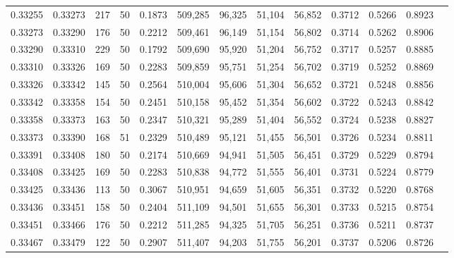 \begin{tabular}{rrrrrrrrrrrrr}
0.33255 & 0.33273 &   217 &  50 &                                     0.1873 & 509,285 &  96,325 &  51,104 &  56,852 & 0.3712 & 0.5266 & 0.8923 \\
0.33273 & 0.33290 &   176 &  50 &                                     0.2212 & 509,461 &  96,149 &  51,154 &  56,802 & 0.3714 & 0.5262 & 0.8906 \\
0.33290 & 0.33310 &   229 &  50 &                                     0.1792 & 509,690 &  95,920 &  51,204 &  56,752 & 0.3717 & 0.5257 & 0.8885 \\
0.33310 & 0.33326 &   169 &  50 &                                     0.2283 & 509,859 &  95,751 &  51,254 &  56,702 & 0.3719 & 0.5252 & 0.8869 \\
0.33326 & 0.33342 &   145 &  50 &                                     0.2564 & 510,004 &  95,606 &  51,304 &  56,652 & 0.3721 & 0.5248 & 0.8856 \\
0.33342 & 0.33358 &   154 &  50 &                                     0.2451 & 510,158 &  95,452 &  51,354 &  56,602 & 0.3722 & 0.5243 & 0.8842 \\
0.33358 & 0.33373 &   163 &  50 &                                     0.2347 & 510,321 &  95,289 &  51,404 &  56,552 & 0.3724 & 0.5238 & 0.8827 \\
0.33373 & 0.33390 &   168 &  51 &                                     0.2329 & 510,489 &  95,121 &  51,455 &  56,501 & 0.3726 & 0.5234 & 0.8811 \\
0.33391 & 0.33408 &   180 &  50 &                                     0.2174 & 510,669 &  94,941 &  51,505 &  56,451 & 0.3729 & 0.5229 & 0.8794 \\
0.33408 & 0.33425 &   169 &  50 &                                     0.2283 & 510,838 &  94,772 &  51,555 &  56,401 & 0.3731 & 0.5224 & 0.8779 \\
0.33425 & 0.33436 &   113 &  50 &                                     0.3067 & 510,951 &  94,659 &  51,605 &  56,351 & 0.3732 & 0.5220 & 0.8768 \\
0.33436 & 0.33451 &   158 &  50 &                                     0.2404 & 511,109 &  94,501 &  51,655 &  56,301 & 0.3733 & 0.5215 & 0.8754 \\
0.33451 & 0.33466 &   176 &  50 &                                     0.2212 & 511,285 &  94,325 &  51,705 &  56,251 & 0.3736 & 0.5211 & 0.8737 \\
0.33467 & 0.33479 &   122 &  50 &                                     0.2907 & 511,407 &  94,203 &  51,755 &  56,201 & 0.3737 & 0.5206 & 0.8726 \\

\end{tabular}
